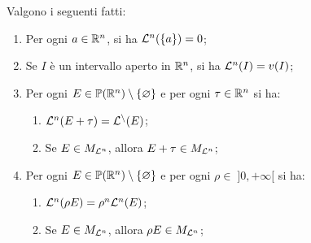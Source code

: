 \begin{shadedTheorem}\label{thm: lebesgue piccolo}
  Valgono i seguenti fatti:
  \begin{enumerate}
      \item Per ogni $a\in \mathbb{R}^n$, si ha $\mathcal{L}^n(\{a\})=0$;
      \item Se $I$ è un intervallo aperto in $\mathbb{R}^n$, si ha $\mathcal{L}^n(I)=v(I)$; 
      \item Per ogni $E\in \mathbb{P}(\mathbb{R}^n)\setminus\{\varnothing\}$ e per ogni $\tau\in \mathbb{R}^n$ si ha:
      \begin{enumerate}
          \item $\mathcal{L}^n(E+\tau)=\mathcal{L^n}(E)$;
          \item Se $E\in M_{\mathcal{L}^n}$, allora $E+\tau\in M_{\mathcal{L}^n}$;
      \end{enumerate}
      \item Per ogni $E\in \mathbb{P}(\mathbb{R}^n)\setminus\{\varnothing\}$ e per ogni $\rho\in\;]0,+\infty[$ si ha:
      \begin{enumerate}
          \item $\mathcal{L}^n(\rho E)=\rho^n\mathcal{L}^n(E)$;
          \item Se $E\in M_{\mathcal{L}^n}$, allora $\rho E\in M_{\mathcal{L}^n}$;
      \end{enumerate}
  \end{enumerate}
\end{shadedTheorem}
